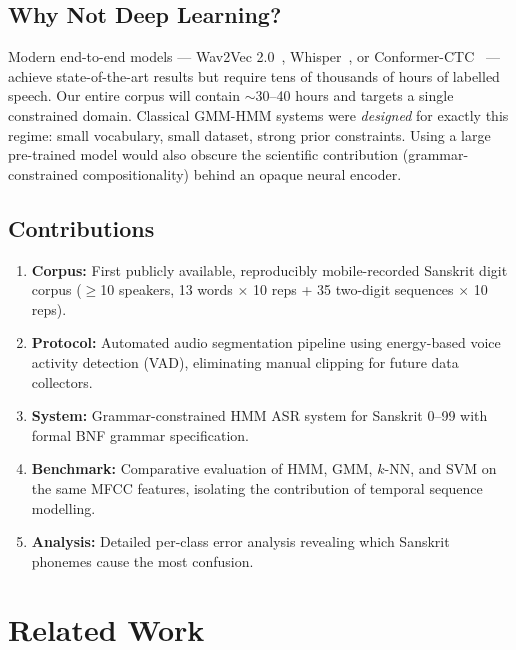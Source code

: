 \documentclass[12pt,a4paper]{article}
\begin{document}
\subsection{Why Not Deep Learning?}

Modern end-to-end models --- Wav2Vec 2.0~\cite{baevski2020wav2vec},
Whisper~\cite{radford2023whisper}, or Conformer-CTC~\cite{gulati2020conformer}
--- achieve state-of-the-art results but require tens of thousands of hours of
labelled speech.
Our entire corpus will contain $\sim$30--40 hours and targets a single
constrained domain.
Classical GMM-HMM systems were \emph{designed} for exactly this regime:
small vocabulary, small dataset, strong prior constraints.
Using a large pre-trained model would also obscure the scientific contribution
(grammar-constrained compositionality) behind an opaque neural encoder.

\subsection{Contributions}

\begin{enumerate}[label=\textbf{C\arabic*.}, leftmargin=2.2em]
  \item \textbf{Corpus:} First publicly available, reproducibly mobile-recorded
        Sanskrit digit corpus ($\geq$10 speakers, 13 words $\times$ 10 reps
        + 35 two-digit sequences $\times$ 10 reps).
  \item \textbf{Protocol:} Automated audio segmentation pipeline using
        energy-based voice activity detection (VAD), eliminating manual
        clipping for future data collectors.
  \item \textbf{System:} Grammar-constrained HMM ASR system for Sanskrit 0--99
        with formal BNF grammar specification.
  \item \textbf{Benchmark:} Comparative evaluation of HMM, GMM, $k$-NN, and SVM
        on the same MFCC features, isolating the contribution of temporal
        sequence modelling.
  \item \textbf{Analysis:} Detailed per-class error analysis revealing which
        Sanskrit phonemes cause the most confusion.
\end{enumerate}

\newpage

\section{Related Work}
\end{document}
